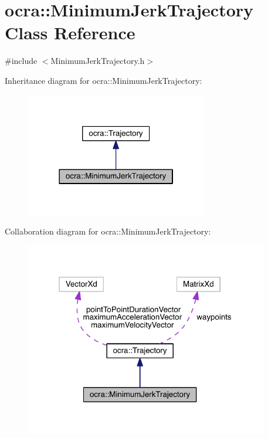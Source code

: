\hypertarget{classocra_1_1MinimumJerkTrajectory}{}\section{ocra\+:\+:Minimum\+Jerk\+Trajectory Class Reference}
\label{classocra_1_1MinimumJerkTrajectory}


{\ttfamily \#include $<$Minimum\+Jerk\+Trajectory.\+h$>$}



Inheritance diagram for ocra\+:\+:Minimum\+Jerk\+Trajectory\+:\nopagebreak
\begin{figure}[H]
\begin{center}
\leavevmode
\includegraphics[width=225pt]{dc/d27/classocra_1_1MinimumJerkTrajectory__inherit__graph}
\end{center}
\end{figure}


Collaboration diagram for ocra\+:\+:Minimum\+Jerk\+Trajectory\+:\nopagebreak
\begin{figure}[H]
\begin{center}
\leavevmode
\includegraphics[width=301pt]{d8/dcd/classocra_1_1MinimumJerkTrajectory__coll__graph}
\end{center}
\end{figure}

